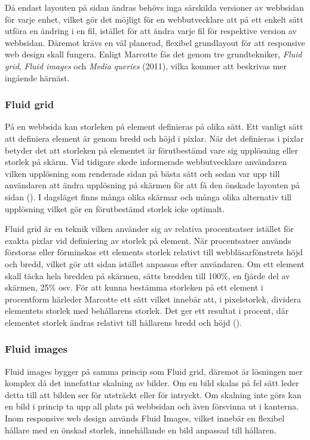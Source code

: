 \documentclass[11pt]{article}
\begin{document}
Då endast layouten på sidan ändras behövs inga särskilda versioner av webbsidan för varje enhet, vilket gör det möjligt för en webbutvecklare att på ett enkelt sätt utföra en ändring i en fil, istället för att ändra varje fil för respektive version av webbsidan. Däremot krävs en väl planerad, flexibel grundlayout för att responsive web design skall fungera. Enligt Marcotte fås det genom tre grundtekniker, \textit{Fluid grid}, \textit{Fluid images} och \textit{Media queries} (2011), vilka kommer att beskrivas mer ingående härnäst.

\subsubsection{Fluid grid}
På en webbsida kan storleken på element definieras på olika sätt. Ett vanligt sätt att definiera element är genom bredd och höjd i pixlar. När det definieras i pixlar betyder det att storleken på elementet är förutbestämd vare sig upplösning eller storlek på skärm. Vid tidigare skede informerade webbutvecklare användaren vilken upplösning som renderade sidan på bästa sätt och sedan var upp till användaren att ändra upplösning på skärmen för att få den önskade layouten på sidan (\cite[s. 6]{resp}). I dagsläget finns många olika skärmar och många olika alternativ till upplösning vilket gör en förutbestämd storlek icke optimalt. 

Fluid grid är en teknik vilken använder sig av relativa procentsatser istället för exakta pixlar vid definiering av storlek på element. När procentsatser används förstoras eller förminskas ett elements storlek relativt till webbläsarfönstrets höjd och bredd, vilket gör att sidan istället anpassas efter användaren. Om ett element skall täcka hela bredden på skärmen, sätts bredden till 100\%, en fjärde del av skärmen, 25\% osv. 
För att kunna bestämma storleken på ett element i procentform härleder Marcotte ett sätt vilket innebär att, i pixelstorlek, dividera elementets storlek med behållarens storlek. Det ger ett resultat i procent, där elementet storlek ändras relativt till hållarens bredd och höjd (\cite[s. 23]{resp}).

\subsubsection{Fluid images}
Fluid images bygger på samma princip som Fluid grid, däremot är lösningen mer komplex då det innefattar skalning av bilder. Om en bild skalas på fel sätt leder detta till att bilden ser för utsträckt eller för intryckt. Om skalning inte görs kan en bild i princip ta upp all plats på webbsidan och även försvinna ut i kanterna. Inom responsive web design används Fluid Images, vilket innebär en flexibel hållare med en önskad storlek, innehållande en bild anpassad till hållaren.  
\end{document}
